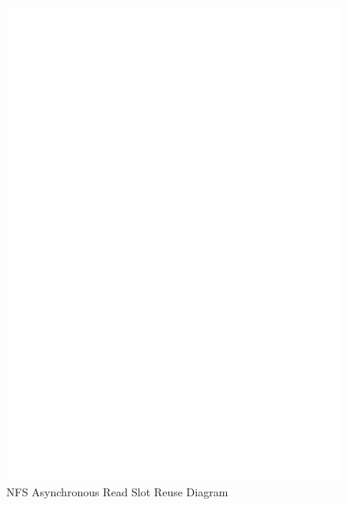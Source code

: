 \begin{figure}
\centering
\includegraphics[scale=0.7]{figures/Slotreuse.eps}
\caption{NFS Asynchronous Read Slot Reuse Diagram}
\label{fig:NFSSlotreuse}
\end{figure}



